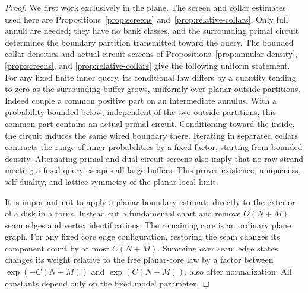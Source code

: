 \begin{proof}
We first work exclusively in the plane. The screen and collar
estimates used here are Propositions~\ref{prop:screens}
and~\ref{prop:relative-collars}. Only full annuli are needed; they
have no bank classes, and the surrounding primal circuit determines
the boundary partition transmitted toward the query.
The bounded collar densities
and actual circuit screens of Propositions~\ref{prop:annular-density},
\ref{prop:screens}, and \ref{prop:relative-collars} give the following
uniform statement. For any fixed finite inner query, its conditional
law differs by a quantity tending to zero as the surrounding buffer
grows, uniformly over planar outside partitions.
Indeed couple a common positive part on an intermediate annulus.
With a probability bounded below, independent of the two outside
partitions, this common part contains an actual primal circuit.
Conditioning toward the inside, the circuit induces the same wired
boundary there. Iterating in separated collars contracts the range
of inner probabilities by a fixed factor, starting from bounded
density. Alternating primal and dual circuit screens also imply that
no raw strand meeting a fixed query escapes all large buffers.
This proves existence, uniqueness, self-duality, and lattice
symmetry of the planar local limit.

It is important not to apply a planar boundary estimate directly to
the exterior of a disk in a torus. Instead cut a fundamental chart
and remove \(O(N+M)\) seam edges and vertex identifications. The
remaining core is an ordinary plane graph. For any fixed core edge
configuration, restoring the seam changes its component count by
at most \(C(N+M)\). Summing over seam edge states changes its weight
relative to the free planar-core law by a factor between
\(\exp(-C(N+M))\) and \(\exp(C(N+M))\), also after normalization.
All constants depend only on the fixed model parameter.


\end{proof}
